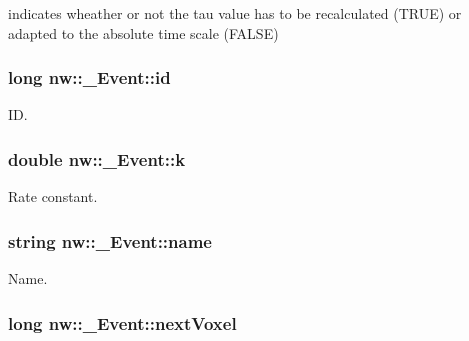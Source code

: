 indicates wheather or not the tau value has to be recalculated ({\ttfamily T\+R\+U\+E}) or adapted to the absolute time scale ({\ttfamily F\+A\+L\+S\+E}) 

\hypertarget{classnw_1_1___event_a8f7ce287f596266dd763ec7db2f74090}{
\subsubsection[{id}]{\setlength{\rightskip}{0pt plus 5cm}long nw\+::\+\_\+\+Event\+::id\hspace{0.3cm}{\ttfamily [protected]}}}\label{classnw_1_1___event_a8f7ce287f596266dd763ec7db2f74090}


I\+D. 

\hypertarget{classnw_1_1___event_afca0ae816e9834add07db8e9a6618faa}{
\subsubsection[{k}]{\setlength{\rightskip}{0pt plus 5cm}double nw\+::\+\_\+\+Event\+::k\hspace{0.3cm}{\ttfamily [protected]}}}\label{classnw_1_1___event_afca0ae816e9834add07db8e9a6618faa}


Rate constant. 

\hypertarget{classnw_1_1___event_ab4f50a54039cd4957bdca55049178562}{
\subsubsection[{name}]{\setlength{\rightskip}{0pt plus 5cm}string nw\+::\+\_\+\+Event\+::name\hspace{0.3cm}{\ttfamily [protected]}}}\label{classnw_1_1___event_ab4f50a54039cd4957bdca55049178562}


Name. 

\hypertarget{classnw_1_1___event_a7864559e204c087306e3becb5b81fb26}{
\subsubsection[{next\+Voxel}]{\setlength{\rightskip}{0pt plus 5cm}long nw\+::\+\_\+\+Event\+::next\+Voxel\hspace{0.3cm}{\ttfamily [protected]}}}\label{classnw_1_1___event_a7864559e204c087306e3becb5b81fb26}


